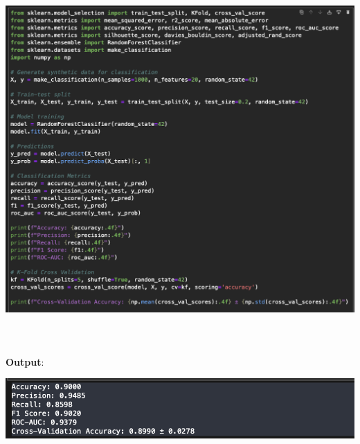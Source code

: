 \documentclass{article}
\begin{document}
\includegraphics[width=14cm,height=14cm]{Evaluation.png}


\textbf{Output}:

\includegraphics[width=14cm,height=4
cm]{Evaluation_Output.png}
\end{document}
